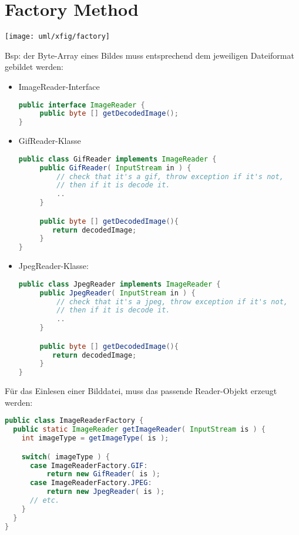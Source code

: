\section{Factory Method}
\begin{center}
\texttt{[image: uml/xfig/factory]}
\end{center}
\newslide
Bsp: der Byte-Array eines Bildes muss entsprechend dem jeweiligen Dateiformat
gebildet werden:
\begin{itemize}
\item ImageReader-Interface
\begin{lstlisting}[language=java]
public interface ImageReader {
     public byte [] getDecodedImage();
}
\end{lstlisting}
\newslide
\item GifReader-Klasse
\begin{lstlisting}[language=java]
public class GifReader implements ImageReader {
     public GifReader( InputStream in ) {
         // check that it's a gif, throw exception if it's not,
         // then if it is decode it.
         ..
     }

     public byte [] getDecodedImage(){
        return decodedImage;
     }
}
\end{lstlisting}
\newslide
\item JpegReader-Klasse:
\begin{lstlisting}[language=java]
public class JpegReader implements ImageReader {
     public JpegReader( InputStream in ) {
         // check that it's a jpeg, throw exception if it's not,
         // then if it is decode it.
         ..
     }

     public byte [] getDecodedImage(){
        return decodedImage;
     }
}
\end{lstlisting}
\end{itemize}
\newslide
Für das Einlesen einer Bilddatei, muss das passende
Reader-Objekt erzeugt werden:
\begin{lstlisting}[language=java]
public class ImageReaderFactory {
  public static ImageReader getImageReader( InputStream is ) {
    int imageType = getImageType( is );

    switch( imageType ) {
      case ImageReaderFactory.GIF:
          return new GifReader( is );
      case ImageReaderFactory.JPEG:
          return new JpegReader( is );
      // etc.
    }
  }
}
\end{lstlisting}
